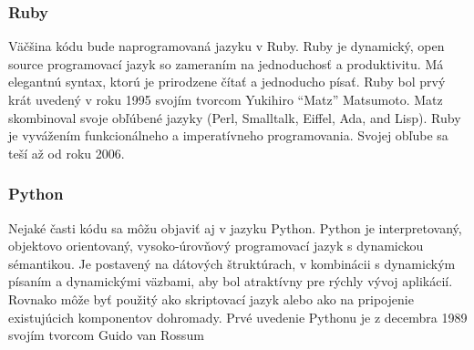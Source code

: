 \subsubsection{Ruby} 
Väčšina kódu bude naprogramovaná jazyku v Ruby. Ruby je dynamický, open source programovací jazyk so zameraním na jednoduchosť a produktivitu. Má elegantnú syntax, ktorú je prirodzene čítať a jednoducho písať. Ruby bol prvý krát uvedený v roku 1995 svojím tvorcom Yukihiro “Matz” Matsumoto. Matz skombinoval svoje obľúbené jazyky (Perl, Smalltalk, Eiffel, Ada, and Lisp). Ruby je vyvážením funkcionálneho a imperatívneho programovania. Svojej obľube sa teší až od roku 2006.\cite{Rb} 
\subsubsection{Python} 
Nejaké časti kódu sa môžu objaviť aj v jazyku Python. Python je interpretovaný, objektovo orientovaný, vysoko-úrovňový programovací jazyk s dynamickou sémantikou. Je postavený na dátových štruktúrach, v kombinácii s dynamickým písaním a dynamickými väzbami, aby bol atraktívny pre rýchly vývoj aplikácií. Rovnako môže byť použitý ako skriptovací jazyk alebo ako  na pripojenie existujúcich komponentov dohromady. Prvé uvedenie Pythonu je z decembra 1989 svojím tvorcom Guido van Rossum\cite{Pt} 
